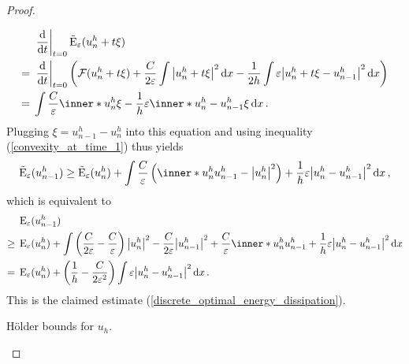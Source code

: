 \begin{proof}
\begin{description}[wide=0pt]
\begin{align*}
			&\left. \dv{ t } \right|_{ t= 0 }
			\tilde{\energy}_{ \varepsilon} ( u_{ n }^{ h } + t \xi )
			\\
			={}&
			\left. \dv{ t } \right|_{ t = 0 } 
			\left(
			\mathcal{ F } ( u_{ n }^{ h } + t \xi )
			+ 
			\frac{ C }{ 2 \varepsilon } 
			\int 
			\abs{ u_{ n }^{ h } + t \xi }^{ 2 } 
			\dd{ x }
			-
			\frac{ 1 }{ 2h } 
			\int 
			\varepsilon
			\abs{ u_{n }^{ h } + t \xi - u_{ n - 1 }^{ h } }^{ 2 } 
			\dd{ x }
			\right)
			\\
			={}& 
			\int
			\frac{ C }{ \varepsilon }
			\inner*{u_{ n }^{ h }}{\xi}
			-
			\frac{ 1 }{ h }
			\varepsilon
			\inner*{ u_{ n }^{ h } - u_{ n - 1 } ^{ h } }{ \xi }
			\dd{x}.
		\end{align*}
		Plugging $ \xi = u_{ n - 1 }^{ h } - u_{ n }^{ h } $ into this equation 
		and using inequality (\ref{convexity_at_time_1}) thus yields
		\begin{equation*}
			\tilde{\energy}_{ \varepsilon } ( u_{ n - 1 }^{ h } ) 
			\geq
			\tilde{\energy}_{ \varepsilon} ( u_{ n }^{ h } )
			+
			\int
			\frac{ C }{ \varepsilon } 
			\left(
			\inner*{ u_{n }^{ h }}{ u_{ n - 1 }^{ h } }
			-
			\abs{ u_{ n }^{ h }}^{ 2 }
			\right)
			+
			\frac{ 1 }{ h }
			\varepsilon
			\abs{ u_{n }^{ h } - u_{ n -1 }^{ h } }^{ 2 }
			\dd{ x },
		\end{equation*}
		which is equivalent to
		\begin{align*}
			& \energy_{ \varepsilon } (u_{ n - 1 }^{ h } )
			\\
			\geq {} &
			\energy_{ \varepsilon } (u_{ n }^{ h } ) +
			\int
			\left(
			\frac{ C }{ 2 \varepsilon }
			-
			\frac{ C }{ \varepsilon }
			\right)
			\abs{ u_{ n }^{ h } }^{ 2 }
			-
			\frac{ C }{ 2 \varepsilon }
			\abs{ u_{n - 1 }^{ h } }^{ 2 }
			+ 
			\frac{ C }{ \varepsilon }
			\inner*{ u_{ n }^{ h } }{ u_{ n - 1 }^{ h } }
			+ 
			\frac{ 1 }{ h }
			\varepsilon
			\abs{ u_{ n }^{ h } - u_{ n - 1 }^{ h } }^{ 2 }
			\dd{ x }
			\\
			= {} &
			\energy_{ \varepsilon } ( u_{n }^{ h } )
			+
			\left( 
			\frac{ 1 }{ h }
			- 
			\frac{ C }{ 2 \varepsilon^{ 2 } }
			\right)
			\int 
			\varepsilon \abs{ u_{n }^{ h } - u_{ n - 1 }^{ h } }^{ 2 }
			\dd{ x }.
		\end{align*}
		This is the claimed estimate 
		(\ref{discrete_optimal_energy_dissipation}).
		
		\item[Step 4:] Hölder bounds for $ u_{ h } $.
		

\end{description}
\end{proof}
